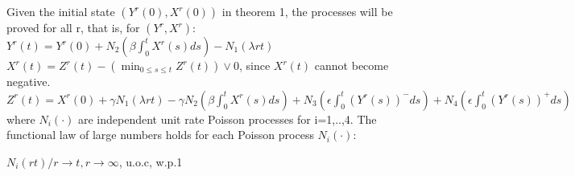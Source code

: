 Given the initial state $(Y^r(0), X^r (0))$ in theorem 1, the processes will be proved for all r, that is, for $(Y^r , X^r)$:
\newline
\newline$Y^r(t)=Y^r(0) +N_2 (\beta \int_0^tX^r(s)ds)-N_1(\lambda rt) $
\newline
\newline $X^r(t)= Z^r(t) - (\min_{0\leq s\leq t} Z^r(t)) \vee 0$, since $X^r(t)$ cannot become negative.
\newline
\newline $Z^r(t)=X^r(0) + \gamma N_1(\lambda rt) - \gamma N_2(\beta \int_0^tX^r(s)ds) +N_3(\epsilon \int_0^t(Y^r(s))^-ds) + N_4(\epsilon \int_0^t(Y^r(s))^+ds)$
\newline
\newline where $N_i(\cdot)$ are independent unit rate Poisson processes for i=1,..,4.
\newline
\newline The functional law of large numbers holds for each Poisson process $N_i(\cdot)$:
\newline
\begin{center}$ N_i(rt)/r \rightarrow t,r \rightarrow \infty$, u.o.c, w.p.1
\end{center}

